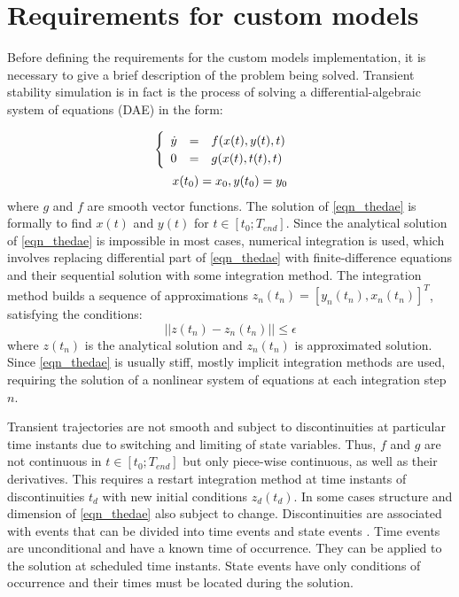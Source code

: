 \documentclass[lettersize,journal]{IEEEtran}
\begin{document}
\section{Requirements for custom models}
Before defining the requirements for the custom models implementation, it is necessary to give a brief description of the problem being solved. 
Transient stability simulation is in fact is the process of solving a differential-algebraic system of equations (DAE) in the form:

\begin{equation}
	\label{eqn_thedae}
	\begin{array}{c}
		\begin{cases}
			\begin{array}{lcl}
				\dot{y}&=&f(x(t), y(t), t) \\
			 	      0&=&g(x(t), t(t), t)\\
			\end{array}
		\end{cases} 
	\vspace{0.5em} \\
	 x(t_0)=x_0, y(t_0)=y_0 \\
	\end{array}
\end{equation}
\noindent where \(g\) and \(f\) are smooth vector functions. The solution of \eqref{eqn_thedae} is formally to find \(x(t)\) and \(y(t)\) for \(t\in[t_0;T_{end}]\). Since the analytical solution of \eqref{eqn_thedae} is impossible in most cases, numerical integration is used, which involves replacing differential part
of \eqref{eqn_thedae} with finite-difference equations and their sequential solution with some integration
method. The integration method builds a sequence of approximations \(z_n(t_n)=[y_n(t_n), x_n(t_n)]^T\), satisfying
the conditions:
\begin{equation}
	\label{eqn_fdapprox}
	\vert\vert z(t_n)-z_n(t_n) \vert\vert \leq \epsilon
\end{equation}
\noindent where \(z(t_n)\) is the analytical solution and \(z_n(t_n)\) is approximated solution. Since \eqref{eqn_thedae} is usually stiff,
mostly implicit integration methods are used, requiring the solution of a nonlinear system of equations at each integration step \(n\).

Transient trajectories are not smooth and subject to discontinuities at particular time instants due to switching and limiting of state variables.
Thus, \(f\) and \(g\) are not continuous in \(t\in[t_0;T_{end}]\) but only piece-wise continuous, as well as their derivatives. This requires a restart integration
method at time instants of discontinuities \(t_d\) with new initial conditions \(z_d(t_d)\). In some cases structure and dimension of \eqref{eqn_thedae}
also subject to change. Discontinuities are associated with events that can be divided into time events and state events \cite{texbook}. Time events are 
unconditional and have a known time of occurrence. They can be applied to the solution at scheduled time instants. State events have only conditions of occurrence and
their times must be located during the solution.
\end{document}
